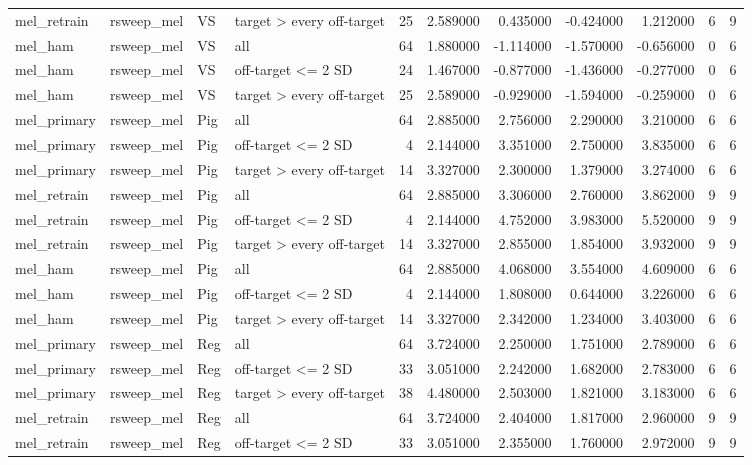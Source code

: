 \begin{table}
\begin{tabular}{llllrrrrrrr}
mel\_retrain & rsweep\_mel & VS & target > every off-target & 25 & 2.589000 & 0.435000 & -0.424000 & 1.212000 & 6 & 9 \\
mel\_ham & rsweep\_mel & VS & all & 64 & 1.880000 & -1.114000 & -1.570000 & -0.656000 & 0 & 6 \\
mel\_ham & rsweep\_mel & VS & off-target <= 2 SD & 24 & 1.467000 & -0.877000 & -1.436000 & -0.277000 & 0 & 6 \\
mel\_ham & rsweep\_mel & VS & target > every off-target & 25 & 2.589000 & -0.929000 & -1.594000 & -0.259000 & 0 & 6 \\
mel\_primary & rsweep\_mel & Pig & all & 64 & 2.885000 & 2.756000 & 2.290000 & 3.210000 & 6 & 6 \\
mel\_primary & rsweep\_mel & Pig & off-target <= 2 SD & 4 & 2.144000 & 3.351000 & 2.750000 & 3.835000 & 6 & 6 \\
mel\_primary & rsweep\_mel & Pig & target > every off-target & 14 & 3.327000 & 2.300000 & 1.379000 & 3.274000 & 6 & 6 \\
mel\_retrain & rsweep\_mel & Pig & all & 64 & 2.885000 & 3.306000 & 2.760000 & 3.862000 & 9 & 9 \\
mel\_retrain & rsweep\_mel & Pig & off-target <= 2 SD & 4 & 2.144000 & 4.752000 & 3.983000 & 5.520000 & 9 & 9 \\
mel\_retrain & rsweep\_mel & Pig & target > every off-target & 14 & 3.327000 & 2.855000 & 1.854000 & 3.932000 & 9 & 9 \\
mel\_ham & rsweep\_mel & Pig & all & 64 & 2.885000 & 4.068000 & 3.554000 & 4.609000 & 6 & 6 \\
mel\_ham & rsweep\_mel & Pig & off-target <= 2 SD & 4 & 2.144000 & 1.808000 & 0.644000 & 3.226000 & 6 & 6 \\
mel\_ham & rsweep\_mel & Pig & target > every off-target & 14 & 3.327000 & 2.342000 & 1.234000 & 3.403000 & 6 & 6 \\
mel\_primary & rsweep\_mel & Reg & all & 64 & 3.724000 & 2.250000 & 1.751000 & 2.789000 & 6 & 6 \\
mel\_primary & rsweep\_mel & Reg & off-target <= 2 SD & 33 & 3.051000 & 2.242000 & 1.682000 & 2.783000 & 6 & 6 \\
mel\_primary & rsweep\_mel & Reg & target > every off-target & 38 & 4.480000 & 2.503000 & 1.821000 & 3.183000 & 6 & 6 \\
mel\_retrain & rsweep\_mel & Reg & all & 64 & 3.724000 & 2.404000 & 1.817000 & 2.960000 & 9 & 9 \\
mel\_retrain & rsweep\_mel & Reg & off-target <= 2 SD & 33 & 3.051000 & 2.355000 & 1.760000 & 2.972000 & 9 & 9 \\

\end{tabular}
\end{table}
